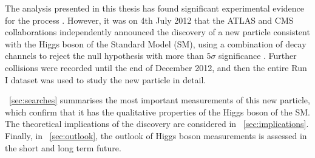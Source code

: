 
The analysis presented in this thesis has found significant experimental evidence for the 
process \ggHWWlvlv. However, it was on 4th July 2012 that the ATLAS and CMS collaborations 
independently 
announced the discovery of a new particle consistent with the Higgs boson of the Standard 
Model (SM), using a combination of decay channels to reject the null hypothesis with more 
than $5\sigma$ significance \cite{ATLAS-discovery,CMS-discovery}. Further \pp collisions 
were recorded until the end of December 2012, and then the entire Run I dataset was used 
to study the new particle in detail.

\Section~\ref{sec:searches} summarises the most important measurements of this new particle, 
which confirm that it has the qualitative properties of the Higgs boson of the SM. The 
theoretical implications of the discovery are considered in \Section~\ref{sec:implications}. 
Finally, in \Section~\ref{sec:outlook}, the outlook of Higgs boson measurements is assessed 
in the short and long term future.
